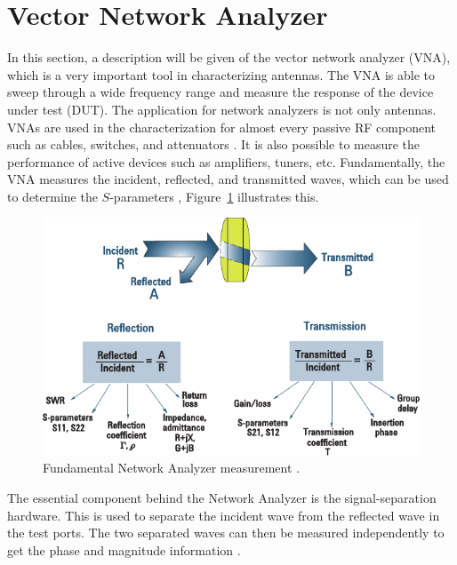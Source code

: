 \section{Vector Network Analyzer}

\begin{aautop}
In this section, a description will be given of the vector network analyzer (VNA), which is a very important tool in characterizing antennas.
The VNA is able to sweep through a wide frequency range and measure the response of the device under test (DUT). The application for network analyzers is not only antennas. VNAs are used in the characterization for almost every passive RF component such as cables, switches, and attenuators \cite{nationalInstruVNA}. It is also possible to measure the performance of active devices such as amplifiers, tuners, etc. Fundamentally, the VNA measures the incident, reflected, and transmitted waves, which can be used to determine the $S$-parameters \cite{nationalInstruVNA}, Figure~\ref{fig:vnaWaves} illustrates this.
\end{aautop}

\begin{figure}[htbp]
    \centering
    \includegraphics{img/analysis/vnaWaves.pdf}
    \caption{Fundamental Network Analyzer measurement \cite{agilentAppNoteVNA}.}
    \label{fig:vnaWaves}
\end{figure}

The essential component behind the Network Analyzer is the signal-separation hardware. This is used to separate the incident wave from the reflected wave in the test ports. The two separated waves can then be measured independently to get the phase and magnitude information \cite{nationalInstruVNA}. 

